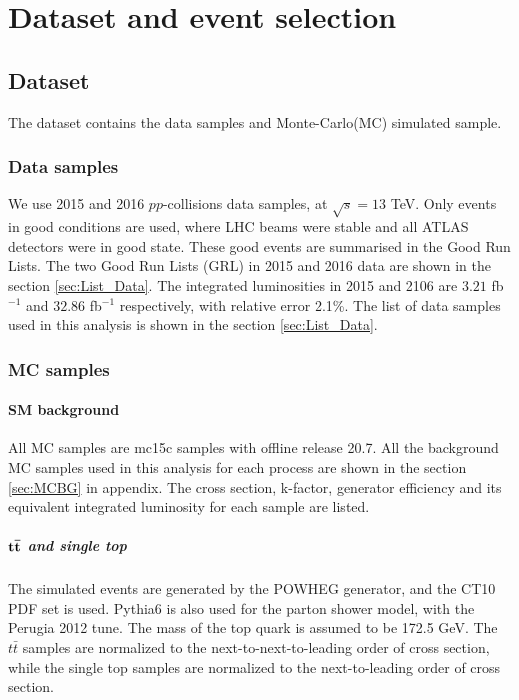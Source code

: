 \chapter{Dataset and event selection}
\label{ch:event}

\section{Dataset}
The dataset contains the data samples and Monte-Carlo(MC) simulated sample.

\subsection{Data samples}
We use 2015 and 2016 $pp$-collisions data samples, at $\sqrt s=13$ TeV.
Only events in good conditions are used, where LHC beams were stable and all ATLAS detectors were in good state.
These good events are summarised in the Good Run Lists.
The two Good Run Lists (GRL) in 2015 and 2016 data are shown in the section \ref{sec:List_Data}.
The integrated luminosities in 2015 and 2106 are $3.21$ fb$^{-1}$ and $32.86$ fb$^{-1}$ respectively, with relative error 2.1\%.
The list of data samples used in this analysis is shown in the section \ref{sec:List_Data}.

\subsection{MC samples}
\subsubsection{SM background}
All MC samples are mc15c samples with offline release 20.7.
All the background MC samples used in this analysis for each process are shown in the section \ref{sec:MCBG} in appendix.
The cross section, k-factor, generator efficiency and its equivalent integrated luminosity for each sample are listed.

\paragraph{$\bf t\bar{t}$ and single top}
The simulated events are generated by the {\sc POWHEG} generator, and the CT10 PDF set is used.
{\sc Pythia6} is also used for the parton shower model, with the {\sc Perugia} 2012 tune.
The mass of the top quark is assumed to be 172.5 GeV.
The $t\bar{t}$ samples are normalized to the next-to-next-to-leading order of cross section, while the single top samples are normalized to the next-to-leading order of cross section.

